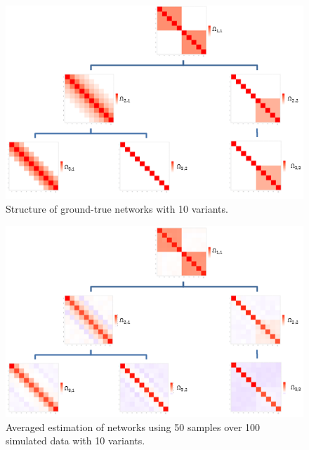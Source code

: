 \documentclass[10pt]{article}
\begin{document}
\begin{figure}
\begin{center}
 \includegraphics[scale=.7]{graph.png}
\end{center}
\caption{Structure of ground-true networks with 10 variants.}
\label{fig:structure1}
\end{figure}



\begin{figure}
\begin{center}
\includegraphics{graphhat100.png}
\end{center}
\caption{Averaged estimation of networks using 50 samples over 100 simulated data with 10 variants.}
\label{fig:structur2}
\end{figure}
\end{document}
